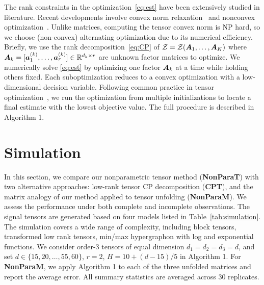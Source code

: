 \documentclass{article}
\theoremstyle{plain}
\theoremstyle{definition}
\def\sign{\textup{sgn}}
\begin{document}
The rank constraints in the optimization~\eqref{eq:est} have been extensively studied in literature. Recent developments involve convex norm relaxation~\cite{ghadermarzy2018learning} and nonconvex optimization~\cite{wang2018learning, han2020optimal}. Unlike matrices, computing the tensor convex norm is NP hard, so we choose (non-convex) alternating optimization due to its numerical efficiency. Briefly, we use the rank decomposition~\eqref{eq:CP} of $\mathcal{Z}=\mathcal{Z}(\bm A_1,\ldots, \bm A_K)$ 
where $\bm A_k=[\bm{a}^{(k)}_1,\ldots,\bm{a}^{(k)}_r]\in\mathbb{R}^{d_k\times r}$ are unknown factor matrices to optimize. We numerically solve \eqref{eq:est} by optimizing one factor $\bm A_k$ at a time while holding others fixed. Each suboptimization reduces to a convex optimization with a low-dimensional decision variable. Following common practice in tensor optimization~\cite{anandkumar2014tensor,hong2020generalized}, we run the optimization from multiple initializations to locate a final estimate with the lowest objective value. The full procedure is described in Algorithm 1.

\section{Simulation}\label{sec:simulation}
In this section, we compare our nonparametric tensor method ({\bf NonParaT}) with two alternative approaches: low-rank tensor CP decomposition ({\bf CPT}), and the matrix analogy of our method applied to tensor unfolding ({\bf NonParaM}). We assess the performance under both complete and incomplete observations. The signal tensors are generated based on four models listed in Table~\ref{tab:simulation}. The simulation covers a wide range of complexity, including block tensors, transformed low rank tensors, min/max hypergraphon with log and exponential functions. We consider order-3  tensors of equal dimension $d_1=d_2=d_3=d$, and set $d\in \{15, 20,\ldots,55,60\}$, $r=2$, $H=10+{(d-15)/ 5}$ in Algorithm 1. For {\bf NonParaM}, we apply Algorithm 1 to each of the three unfolded matrices and report the average error. All summary statistics are averaged across $30$ replicates.  
\end{document}
